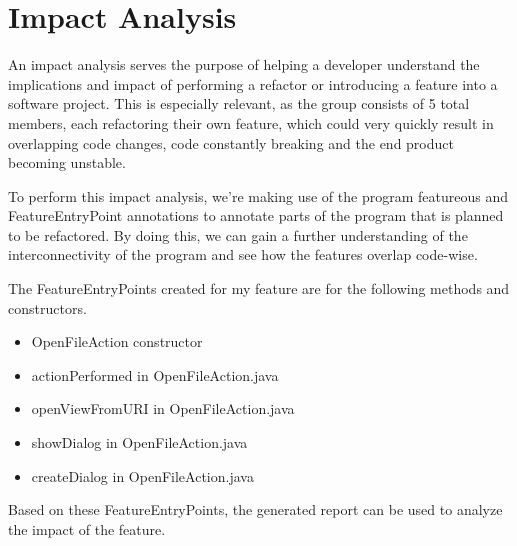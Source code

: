 \section{Impact Analysis}
An impact analysis serves the purpose of helping a developer understand the implications and impact of performing a refactor or introducing a feature into a software project. This is especially relevant, as the group consists of 5 total members, each refactoring their own feature, which could very quickly result in overlapping code changes, code constantly breaking and the end product becoming unstable.

To perform this impact analysis, we're making use of the program featureous and FeatureEntryPoint annotations to annotate parts of the program that is planned to be refactored. By doing this, we can gain a further understanding of the interconnectivity of the program and see how the features overlap code-wise.

The FeatureEntryPoints created for my feature are for the following methods and constructors.

\begin{itemize}
    \item OpenFileAction constructor
    \item actionPerformed in OpenFileAction.java
    \item openViewFromURI in OpenFileAction.java
    \item showDialog in OpenFileAction.java
    \item createDialog in OpenFileAction.java
\end{itemize}

Based on these FeatureEntryPoints, the generated report can be used to analyze the impact of the feature.

